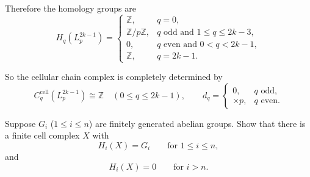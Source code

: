 \begin{solution}
Therefore the homology groups are
\[
H_q(L_p^{2k-1})=
\begin{cases}
	\mathbb Z, & q=0,\\[4pt]
	\mathbb Z/p\mathbb Z, & q \text{ odd and }1\le q\le 2k-3,\\[4pt]
	0, & q \text{ even and }0<q<2k-1,\\[4pt]
	\mathbb Z, & q=2k-1.
\end{cases}
\]

So the cellular chain complex is completely determined by
\[
C_q^{\mathrm{cell}}(L_p^{2k-1})\cong \mathbb Z \quad (0\le q\le 2k-1),
\qquad
d_q=
\begin{cases}
	0, & q\text{ odd},\\
	\times p, & q\text{ even}.
\end{cases}
\]

\par
\end{solution}

\begin{problem}
Suppose \(G_i\) (\(1\le i\le n\)) are finitely generated abelian groups. Show that there is a finite cell complex \(X\) with
\[
H_i(X)=G_i \qquad \text{for } 1\le i\le n,
\]
and
\[
H_i(X)=0 \qquad \text{for } i>n.
\]
\end{problem}

